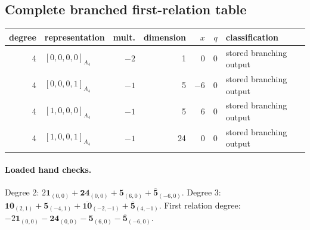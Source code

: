 \documentclass[11pt]{article}
\newcommand{\Dynkin}[1]{#1}
\begin{document}
\subsection{Complete branched first-relation table}
\begin{longtable}{r l r r r r l}
\toprule degree & representation & mult. & dimension & $x$ & $q$ & classification\\\midrule\endhead
4 & $\Dynkin{[0,0,0,0]_{A_4}}$ & $-2$ & 1 & $0$ & $0$ & stored branching output\\
4 & $\Dynkin{[0,0,0,1]_{A_4}}$ & $-1$ & 5 & $-6$ & $0$ & stored branching output\\
4 & $\Dynkin{[1,0,0,0]_{A_4}}$ & $-1$ & 5 & $6$ & $0$ & stored branching output\\
4 & $\Dynkin{[1,0,0,1]_{A_4}}$ & $-1$ & 24 & $0$ & $0$ & stored branching output\\
\bottomrule\end{longtable}
\paragraph{Loaded hand checks.} Degree 2: $2\mathbf1_{(0,0)}+\mathbf{24}_{(0,0)}+\mathbf5_{(6,0)}+\overline{\mathbf5}_{(-6,0)}$. Degree 3: $\mathbf{10}_{(2,1)}+\mathbf5_{(-4,1)}+\overline{\mathbf{10}}_{(-2,-1)}+\overline{\mathbf5}_{(4,-1)}$. First relation degree: $-2\mathbf1_{(0,0)}-\mathbf{24}_{(0,0)}-\mathbf5_{(6,0)}-\overline{\mathbf5}_{(-6,0)}$.
\end{document}
